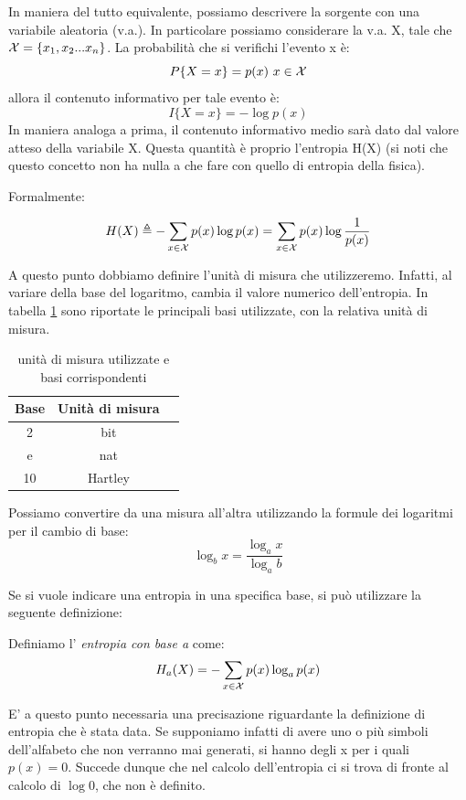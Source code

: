 In maniera del tutto equivalente, possiamo descrivere la sorgente con una variabile aleatoria (v.a.).
In particolare possiamo considerare la v.a. X, tale che \(\mathcal{X} = \{x_1, x_2 ... x_n\}\).
La probabilità che si verifichi l'evento x è:
\[P\{X = x\} = p(x) \ x \in \mathcal{X}\]
allora il contenuto informativo per tale evento è:
\[I\{X = x\} = - \log p(x)\]
In maniera analoga a prima, il contenuto informativo medio sarà dato dal valore atteso della variabile X.
Questa quantità è proprio l'entropia H(X) (si noti che questo concetto non ha nulla a che fare con quello di entropia della fisica).

\noindent
Formalmente:
\begin{definizione}
\[H(X) \triangleq - \sum_{x \in \mathcal{X}} p(x) \log p(x) = \sum_{x \in \mathcal{X}} p(x) \log \frac{1}{p(x)}\]
\end{definizione}

A questo punto dobbiamo definire l'unità di misura che utilizzeremo. Infatti, al variare della base del logaritmo, cambia 
il valore numerico dell'entropia. In tabella \ref{tab:0001} sono riportate le principali basi utilizzate, con la relativa unità di misura.

\begin{table}[htbp]
	\begin{center}
	\begin{tabular}{ccc}
		\toprule
		Base & Unità di misura \\ 
		\midrule 
		2    & bit             \\ 
		e    & nat             \\ 
		10   & Hartley         \\ 
		\bottomrule               
	\end{tabular}
	\caption{unità di misura utilizzate e basi corrispondenti}
	\label{tab:0001}
	\end{center}
\end{table}

\noindent
Possiamo convertire da una misura all'altra utilizzando la formule dei logaritmi per il cambio di base:
\[\log_b x = \frac{\log_a x}{\log_a b}\]

\noindent
Se si vuole indicare una entropia in una specifica base, si può utilizzare la seguente definizione:
\begin{definizione}
Definiamo l' \textit{entropia con base a} come:
\[H_a(X) = - \sum_{x \in \mathcal{X}} p(x) \log_a p(x)\]
\end{definizione}

E' a questo punto necessaria una precisazione riguardante la definizione di entropia che è stata data.
Se supponiamo infatti di avere uno o più simboli dell'alfabeto che non verranno mai generati, si 
hanno degli x per i quali \(p(x) = 0\).
Succede dunque che nel calcolo dell'entropia ci si trova di fronte al calcolo di \(\log 0\), che non è definito.

